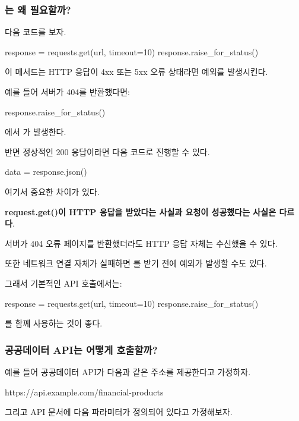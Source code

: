 \subsubsection{는 왜 필요할까?}

다음 코드를 보자.

\begin{dhkcode}
response = requests.get(url, timeout=10)
response.raise_for_status()
\end{dhkcode}

이 메서드는 HTTP 응답이 4xx 또는 5xx 오류 상태라면 예외를 발생시킨다.

예를 들어 서버가 404를 반환했다면:

\begin{dhkcode}
response.raise_for_status()
\end{dhkcode}

에서 가 발생한다.

반면 정상적인 200 응답이라면 다음 코드로 진행할 수 있다.

\begin{dhkcode}
data = response.json()
\end{dhkcode}

여기서 중요한 차이가 있다.

\textbf{request.get()이 HTTP 응답을 받았다는 사실과 요청이 성공했다는 사실은 다르다}.

서버가 404 오류 페이지를 반환했더라도 HTTP 응답 자체는 수신했을 수 있다.

또한 네트워크 연결 자체가 실패하면 를 받기 전에 예외가 발생할 수도 있다.

그래서 기본적인 API 호출에서는:

\begin{dhkcode}
response = requests.get(url, timeout=10)
response.raise_for_status()
\end{dhkcode}

를 함께 사용하는 것이 좋다.

\subsubsection{공공데이터 API는 어떻게 호출할까?}

예를 들어 공공데이터 API가 다음과 같은 주소를 제공한다고 가정하자.

\begin{dhkzsh}
https://api.example.com/financial-products
\end{dhkzsh}

그리고 API 문서에 다음 파라미터가 정의되어 있다고 가정해보자.

